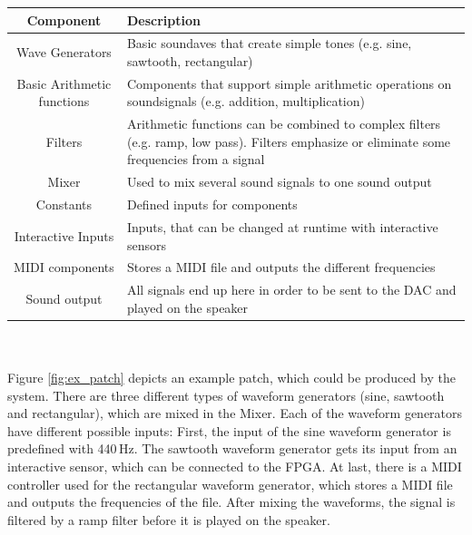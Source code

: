 	 \begin{tabular}[h]{|c|p{9.75cm}|}
	  \hline
	  Component & Description \\
	  \hline
	  \hline
	  Wave Generators & Basic soundaves that create simple tones (e.g. sine, sawtooth, rectangular) \\\hline
		Basic Arithmetic functions & Components that support simple arithmetic operations on soundsignals (e.g. addition, multiplication)\\\hline
		Filters & Arithmetic functions can be combined to complex filters (e.g. ramp, low pass). Filters emphasize or eliminate some frequencies from a signal \\\hline
		Mixer & Used to mix several sound signals to one sound output \\\hline
		Constants & Defined inputs for components \\\hline
		Interactive Inputs & Inputs, that can be changed at runtime with interactive sensors \\\hline
		MIDI components & Stores a MIDI file and outputs the different frequencies \\\hline
		Sound output & All signals end up here in order to be sent to the \ac{DAC} and played on the speaker \\\hline
	 \end{tabular}
\\\\


Figure \ref{fig:ex_patch} depicts an example patch, which could be produced by the system. There are three different types of waveform generators (sine, sawtooth and rectangular), which are mixed in the Mixer. Each of the waveform generators have different possible inputs: First, the input of the sine waveform generator is predefined with 440\,Hz. The sawtooth waveform generator gets its input from an interactive sensor, which can be connected to the \ac{FPGA}. At last, there is a MIDI controller used for the rectangular waveform generator, which stores a MIDI file and outputs the frequencies of the file.
After mixing the waveforms, the signal is filtered by a ramp filter before it is played on the speaker.


